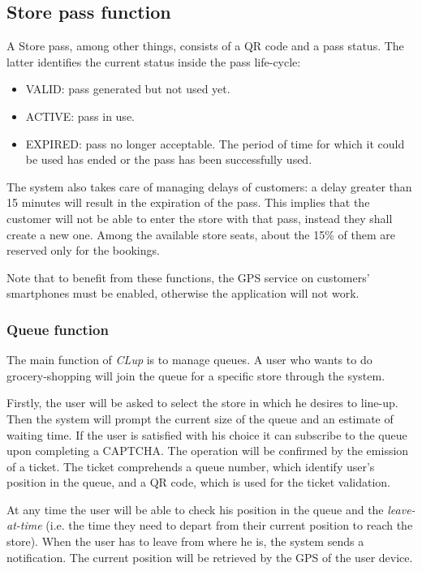 \subsection{Store pass function}
	A Store pass, among other things, consists of a QR code and a pass status. The latter identifies the current status inside the pass life-cycle:
	\begin{itemize}
		\item VALID: pass generated but not used yet.
		\item ACTIVE: pass in use.
		\item EXPIRED: pass no longer acceptable. The period of time for which it could be used has ended or the pass has been successfully used.
	\end{itemize}

	The system also takes care of managing delays of customers: a delay greater than 15 minutes will result in the expiration of the pass. This implies that the customer will not be able to enter the store with that pass, instead they shall create a new one.\newline
	Among the available store seats, about the 15\% of them are reserved only for the bookings.

	Note that to benefit from these functions, the GPS service on customers' smartphones must be enabled, otherwise the application will not work.

	\subsubsection{Queue function}
	The main function of \textit{CLup} is to manage queues. A user who wants to do grocery-shopping will join the queue for a specific store through the system.\newline

	Firstly, the user will be asked to select the store in which he desires to line-up.\newline
	Then the system will prompt the current size of the queue and an estimate of waiting time. If the user is satisfied with his choice it can subscribe to the queue upon completing a CAPTCHA. The operation will be confirmed by the emission of a ticket. The ticket comprehends a queue number, which identify user's position in the queue, and a QR code, which is used for the ticket validation.

	At any time the user will be able to check his position in the queue and the \textit{leave-at-time} (i.e. the time they need to depart from their current position to reach the store). When the user has to leave from where he is, the system sends a notification. The current position will be retrieved by the GPS of the user device.


